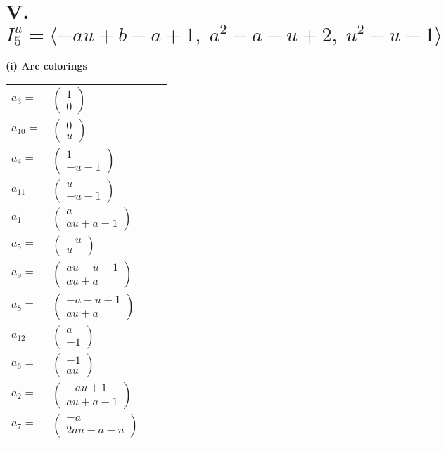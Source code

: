 \documentclass[1p]{elsarticle_modified}
\theoremstyle{definition}
\begin{document}
\centering \section*{V. $I^u_{5}= \langle - a u+b- a+1,\;a^2- a- u+2,\;u^2- u-1 \rangle$}
\flushleft \textbf{(i) Arc colorings}\\
\begin{tabular}{m{7pt} m{180pt} m{7pt} m{180pt} }
\flushright $a_{3}=$&$\begin{pmatrix}1\\0\end{pmatrix}$ \\
\flushright $a_{10}=$&$\begin{pmatrix}0\\u\end{pmatrix}$ \\
\flushright $a_{4}=$&$\begin{pmatrix}1\\- u-1\end{pmatrix}$ \\
\flushright $a_{11}=$&$\begin{pmatrix}u\\- u-1\end{pmatrix}$ \\
\flushright $a_{1}=$&$\begin{pmatrix}a\\a u+a-1\end{pmatrix}$ \\
\flushright $a_{5}=$&$\begin{pmatrix}- u\\u\end{pmatrix}$ \\
\flushright $a_{9}=$&$\begin{pmatrix}a u- u+1\\a u+a\end{pmatrix}$ \\
\flushright $a_{8}=$&$\begin{pmatrix}- a- u+1\\a u+a\end{pmatrix}$ \\
\flushright $a_{12}=$&$\begin{pmatrix}a\\-1\end{pmatrix}$ \\
\flushright $a_{6}=$&$\begin{pmatrix}-1\\a u\end{pmatrix}$ \\
\flushright $a_{2}=$&$\begin{pmatrix}- a u+1\\a u+a-1\end{pmatrix}$ \\
\flushright $a_{7}=$&$\begin{pmatrix}- a\\2 a u+a- u\end{pmatrix}$\\&\end{tabular}
\end{document}
